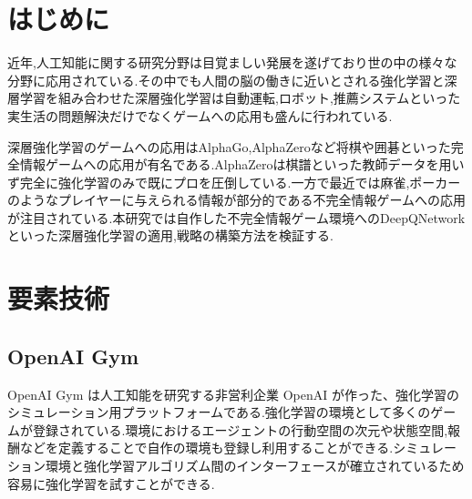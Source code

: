 \documentclass[twocolumn]{jarticle}     %
\begin{document}

\section{はじめに}
近年,人工知能に関する研究分野は目覚ましい発展を遂げており世の中の様々な分野に応用されている.その中でも人間の脳の働きに近いとされる強化学習と深層学習を組み合わせた深層強化学習は自動運転,ロボット,推薦システムといった実生活の問題解決だけでなくゲームへの応用も盛んに行われている.
\par
深層強化学習のゲームへの応用はAlphaGo,AlphaZeroなど将棋や囲碁といった完全情報ゲームへの応用が有名である.AlphaZeroは棋譜といった教師データを用いず完全に強化学習のみで既にプロを圧倒している.一方で最近では麻雀,ポーカーのようなプレイヤーに与えられる情報が部分的である不完全情報ゲームへの応用が注目されている.本研究では自作した不完全情報ゲーム環境へのDeepQNetworkといった深層強化学習の適用,戦略の構築方法を検証する.

\section{要素技術}

\subsection{OpenAI Gym}
OpenAI Gym は人工知能を研究する非営利企業 OpenAI が作った、強化学習のシミュレーション用プラットフォームである.強化学習の環境として多くのゲームが登録されている.環境におけるエージェントの行動空間の次元や状態空間,報酬などを定義することで自作の環境も登録し利用することができる.シミュレーション環境と強化学習アルゴリズム間のインターフェースが確立されているため容易に強化学習を試すことができる.
\end{document}
